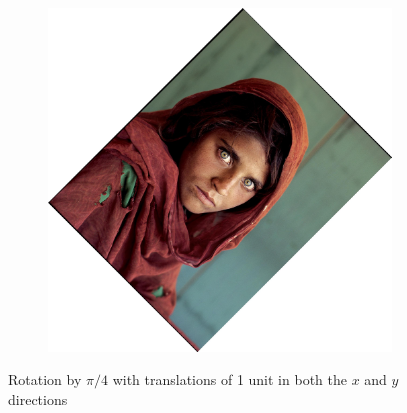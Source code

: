 \documentclass{article}
\begin{document}
\begin{figure}[H]
\begin{subfigure}{.3\textwidth}
    \end{subfigure}
    \begin{subfigure}{.3\textwidth}
        \centering
        \includegraphics[scale=0.04]{q1/output/similar_d:_4_s:_2.jpg}
    \end{subfigure}
    \caption{Rotation by \(\pi/4\) with translations of 1 unit in both the \(x\) and \(y\) directions}
\end{figure}
\end{document}
